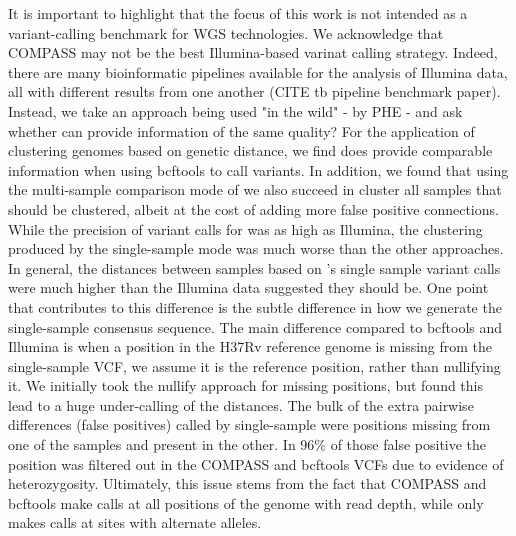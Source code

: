 It is important to highlight that the focus of this work is not intended as a variant-calling benchmark for WGS technologies. We acknowledge that COMPASS may not be the best Illumina-based varinat calling strategy. Indeed, there are many bioinformatic pipelines available for the analysis of \mtb{} Illumina data, all with different results from one another (CITE tb pipeline benchmark paper). Instead, we take an approach being used "in the wild" - by PHE - and ask whether \ont{} can provide information of the same quality? For the application of clustering genomes based on genetic distance, we find \ont{} does provide comparable information when using bcftools to call variants. In addition, we found that using the multi-sample comparison mode of \pandora{} we also succeed in cluster all samples that should be clustered, albeit at the cost of adding more false positive connections. While the precision of variant calls for \pandora{} was as high as Illumina, the clustering produced by the single-sample mode was much worse than the other approaches. In general, the distances between samples based on \pandora{}'s single sample variant calls were much higher than the Illumina data suggested they should be. One point that contributes to this difference is the subtle difference in how we generate the \pandora{} single-sample consensus sequence. The main difference compared to bcftools and Illumina is when a position in the H37Rv reference genome is missing from the \pandora{} single-sample VCF, we assume it is the reference position, rather than nullifying it. We initially took the nullify approach for missing positions, but found this lead to a huge under-calling of the distances. The bulk of the extra pairwise differences (false positives) called by \pandora{} single-sample were positions missing from one of the samples and present in the other. In 96\% of those false positive the position was filtered out in the COMPASS and bcftools VCFs due to evidence of heterozygosity. Ultimately, this issue stems from the fact that COMPASS and bcftools make calls at all positions of the genome with read depth, while \pandora{} only makes calls at sites with alternate alleles. 
